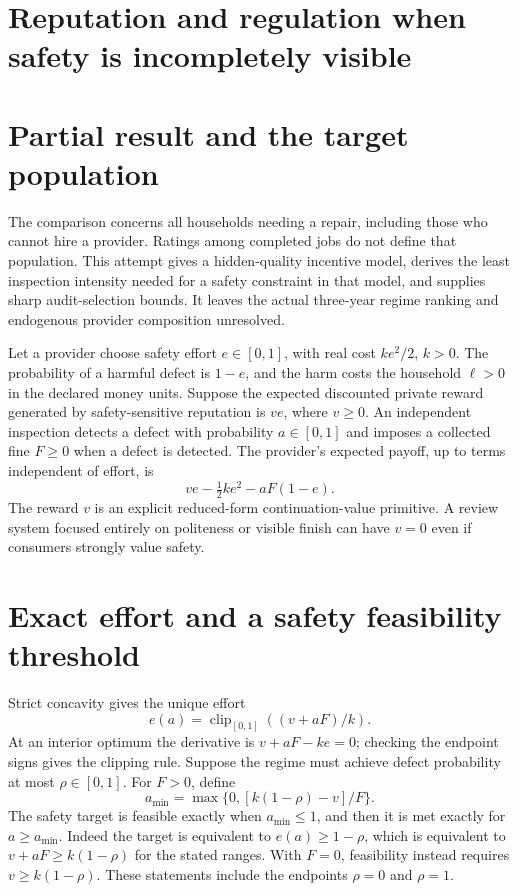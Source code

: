 \documentclass[11pt,a4paper]{article}
\begin{document}
\section*{Reputation and regulation when safety is incompletely visible}
\section{Partial result and the target population}
The comparison concerns all households needing a repair, including those who cannot hire a provider. Ratings among completed jobs do not define that population. This attempt gives a hidden-quality incentive model, derives the least inspection intensity needed for a safety constraint in that model, and supplies sharp audit-selection bounds. It leaves the actual three-year regime ranking and endogenous provider composition unresolved.

Let a provider choose safety effort $e\in[0,1]$, with real cost $ke^2/2$, $k>0$. The probability of a harmful defect is $1-e$, and the harm costs the household $\ell>0$ in the declared money units. Suppose the expected discounted private reward generated by safety-sensitive reputation is $ve$, where $v\ge0$. An independent inspection detects a defect with probability $a\in[0,1]$ and imposes a collected fine $F\ge0$ when a defect is detected. The provider's expected payoff, up to terms independent of effort, is
\[
 ve-\tfrac12ke^2-aF(1-e).
\]
The reward $v$ is an explicit reduced-form continuation-value primitive. A review system focused entirely on politeness or visible finish can have $v=0$ even if consumers strongly value safety.

\section{Exact effort and a safety feasibility threshold}
Strict concavity gives the unique effort
\[
 e(a)=\operatorname{clip}_{[0,1]}((v+aF)/k). \tag{1}
\]
At an interior optimum the derivative is $v+aF-ke=0$; checking the endpoint signs gives the clipping rule. Suppose the regime must achieve defect probability at most $\rho\in[0,1]$. For $F>0$, define
\[
 a_{\min}=\max\{0,[k(1-\rho)-v]/F\}. \tag{2}
\]
The safety target is feasible exactly when $a_{\min}\le1$, and then it is met exactly for $a\ge a_{\min}$. Indeed the target is equivalent to $e(a)\ge1-\rho$, which is equivalent to $v+aF\ge k(1-\rho)$ for the stated ranges. With $F=0$, feasibility instead requires $v\ge k(1-\rho)$. These statements include the endpoints $\rho=0$ and $\rho=1$.
\end{document}
